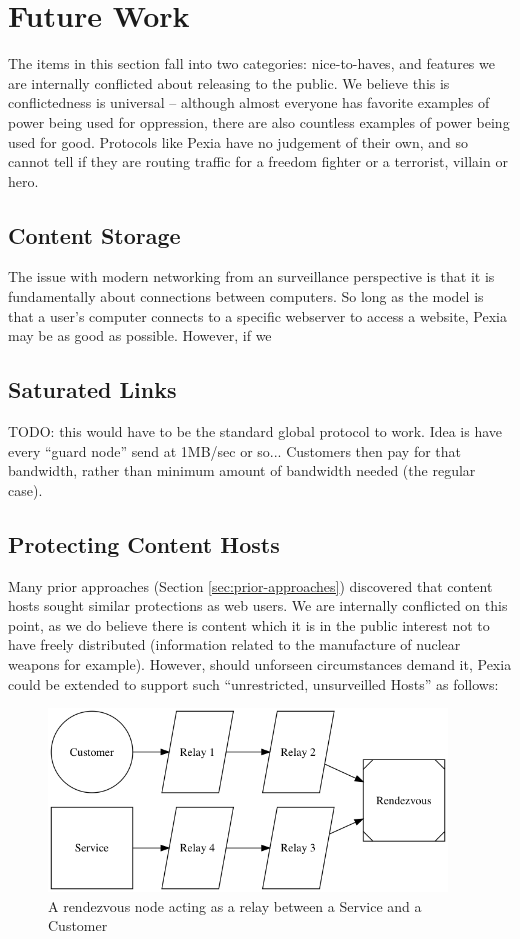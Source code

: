 \documentclass{article}
\newcommand{\mesh}{Pexia}
\newcommand{\Pexia}{\mesh}
\begin{document}
\section{Future Work}
\label{sec:future}

The items in this section fall into two categories: nice-to-haves, and features we are internally conflicted about releasing to the public. We believe this is conflictedness is universal -- although almost everyone has favorite examples of power being used for oppression, there are also countless examples of power being used for good. Protocols like \Pexia{} have no judgement of their own, and so cannot tell if they are routing traffic for a freedom fighter or a terrorist, villain or hero.

\subsection{Content Storage}
\label{subsec:ccn}

The issue with modern networking from an surveillance perspective is that it is fundamentally about connections between computers. So long as the model is that a user's computer connects to a specific webserver to access a website, \Pexia{} may be as good as possible. However, if we

\subsection{Saturated Links}
\label{subsec:saturated-links}

TODO: this would have to be the standard global protocol to work. Idea is have every ``guard node'' send at 1MB/sec or so... Customers then pay for that bandwidth, rather than minimum amount of bandwidth needed (the regular case).

\subsection{Protecting Content Hosts}
\label{subsec:protocol-extentions}

Many prior approaches (Section \ref{sec:prior-approaches}) discovered that content hosts sought similar protections as web users. We are internally conflicted on this point, as we do believe there is content which it is in the public interest not to have freely distributed (information related to the manufacture of nuclear weapons for example). However, should unforseen circumstances demand it, \Pexia{} could be extended to support such ``unrestricted, unsurveilled Hosts'' as follows:

\begin{figure}[htbp]
  \centering
  \includegraphics[width = 300pt]{sttRttc}
  \caption{A rendezvous node acting as a relay between a Service and a Customer}
\end{figure}


\nocite{*}
\printbibliography
\end{document}
